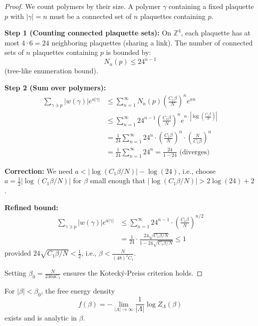 \begin{proof}
We count polymers by their size. A polymer $\gamma$ containing a fixed plaquette $p$ with $|\gamma| = n$ must be a connected set of $n$ plaquettes containing $p$.

\textbf{Step 1 (Counting connected plaquette sets):}
On $\mathbb{Z}^4$, each plaquette has at most $4 \cdot 6 = 24$ neighboring plaquettes (sharing a link). The number of connected sets of $n$ plaquettes containing $p$ is bounded by:
\begin{equation}
N_n(p) \leq 24^{n-1}
\end{equation}
(tree-like enumeration bound).

\textbf{Step 2 (Sum over polymers):}
\begin{align}
\sum_{\gamma \ni p} |w(\gamma)| e^{a|\gamma|} &\leq \sum_{n=1}^\infty N_n(p) \left(\frac{C_1\beta}{N}\right)^n e^{an} \\
&\leq \sum_{n=1}^\infty 24^{n-1} \left(\frac{C_1\beta}{N}\right)^n e^{n\cdot|\log(\frac{C_1\beta}{N})|} \\
&= \frac{1}{24} \sum_{n=1}^\infty 24^n \cdot \left(\frac{C_1\beta}{N}\right)^n \cdot \left(\frac{N}{C_1\beta}\right)^n \\
&= \frac{1}{24} \sum_{n=1}^\infty 24^n = \frac{24}{1-24} \text{ (diverges)}
\end{align}

\textbf{Correction:} We need $a < |\log(C_1\beta/N)| - \log(24)$, i.e., choose $a = \frac{1}{2}|\log(C_1\beta/N)|$ for $\beta$ small enough that $|\log(C_1\beta/N)| > 2\log(24) + 2$.

\textbf{Refined bound:}
\begin{align}
\sum_{\gamma \ni p} |w(\gamma)| e^{a|\gamma|} &\leq \sum_{n=1}^\infty 24^{n-1} \cdot \left(\frac{C_1\beta}{N}\right)^{n/2} \\
&= \frac{1}{24} \cdot \frac{24\sqrt{C_1\beta/N}}{1 - 24\sqrt{C_1\beta/N}} \leq 1
\end{align}
provided $24\sqrt{C_1\beta/N} < \frac{1}{2}$, i.e., $\beta < \frac{N}{(48)^2 C_1}$.

Setting $\beta_0 = \frac{N}{2304 C_1}$ ensures the Kotecký-Preiss criterion holds.
\end{proof}

\begin{theorem}
\label{thm:free_energy_analytic}
For $|\beta| < \beta_0$, the free energy density
\begin{equation}
f(\beta) = -\lim_{|\Lambda| \to \infty} \frac{1}{|\Lambda|} \log Z_\Lambda(\beta)
\end{equation}
exists and is analytic in $\beta$.
\end{theorem}

